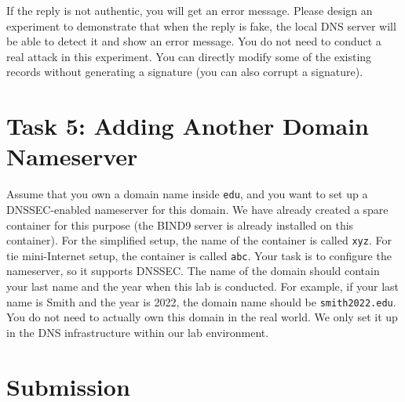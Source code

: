 If the reply is not authentic, you will get an error message. 
Please design an experiment to demonstrate that when the reply 
is fake, the local DNS server will be able to detect it and 
show an error message. You do not need to conduct a real attack 
in this experiment. You can directly modify some of the existing
records without generating a signature (you can also corrupt 
a signature). 


\section{Task 5: Adding Another Domain Nameserver} 

Assume that you own a domain name inside \texttt{edu}, 
and you want to 
set up a DNSSEC-enabled nameserver for this domain. We have already
created a spare container for this purpose (the BIND9 server is already
installed on this container). For the simplified 
setup, the name of the container is called \texttt{xyz}. 
For tie mini-Internet setup, the container is called \texttt{abc}. 
Your task is to configure the nameserver, so it supports DNSSEC.
The name of the domain should contain your last name and the year
when this lab is conducted. For example, if your last name is Smith and
the year is 2022, the domain name should be \texttt{smith2022.edu}. 
You do not need to actually own this domain in the real world. We only 
set it up in the DNS infrastructure within our lab environment.



\section{Submission}





